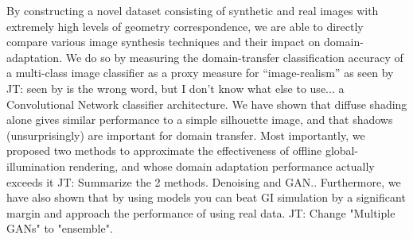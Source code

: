 \documentclass[10pt,twocolumn,letterpaper]{article}
\newcommand{\tompson}[1]{{\color{green} JT: #1}}
\begin{document}
By constructing a novel dataset consisting of synthetic and real images with extremely high levels of geometry correspondence, we are able to directly compare various image synthesis techniques and their impact on domain-adaptation. We do so by measuring the domain-transfer classification accuracy of a multi-class image classifier as a proxy measure for ``image-realism'' as seen by \tompson{seen by is the wrong word, but I don't know what else to use...} a Convolutional Network classifier architecture.  We have shown that diffuse shading alone gives similar performance to a simple silhouette image, and that shadows (unsurprisingly) are important for domain transfer.  Most importantly, we proposed two methods to approximate the effectiveness of offline global-illumination rendering, and whose domain adaptation performance actually exceeds it \tompson{Summarize the 2 methods. Denoising and GAN.}. Furthermore, we have also shown that by using 
models you can beat GI simulation by a significant margin and approach the performance of using real data. \tompson{Change "Multiple GANs" to "ensemble".}

\end{document}
